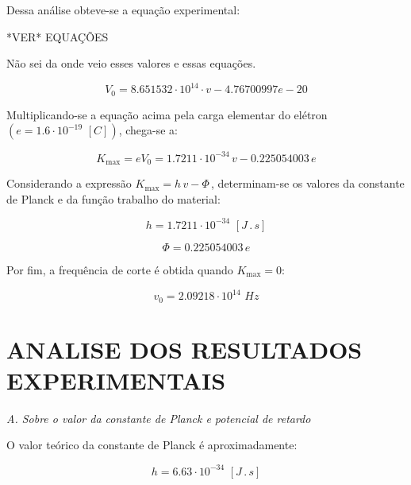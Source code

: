 \documentclass[10pt,twocolumn,letterpaper]{article}
\begin{document}
\noindent Dessa análise obteve-se a equação experimental:

{\Huge \color{red} *VER* EQUAÇÕES}

{\color{red} Não sei da onde veio esses valores e essas equações.}

\begin{equation*}
    V_0 = 8.651532\cdot 10^{14} \cdot v - 4.76700997e-20
\end{equation*}

\hspace{1cm} Multiplicando-se a equação acima pela carga elementar do elétron $(e = 1.6 \cdot 10^{-19} \,\, [C])$, chega-se a:

\begin{equation*}
    K_{\max} = eV_0 = 1.7211 \cdot 10^{-34}\,v - 0.225054003\,e
\end{equation*}

\hspace{1cm} Considerando a expressão $K_{\max} = h\,v - \Phi\,$, determinam-se os valores da constante de Planck e da função trabalho do material:

\begin{equation*}
    h = 1.7211\cdot 10^{-34} \,\, [J\,.\,s]
\end{equation*}

\begin{equation*}
    \Phi = 0.225054003\,e
\end{equation*}

\noindent Por fim, a frequência de corte é obtida quando $K_{\max} = 0$:

\begin{equation*}
    v_0 = 2.09218 \cdot 10^{14} \,\, Hz
\end{equation*}


\section{ANALISE DOS RESULTADOS EXPERIMENTAIS}

\noindent\textit{A. Sobre o valor da constante de Planck e potencial de
retardo}

\noindent O valor teórico da constante de Planck é aproximadamente:

\vspace{-.3cm}

\begin{equation*}
    h = 6.63 \cdot 10^{-34} \,\, [J\,.\,s]
\end{equation*}
\end{document}
